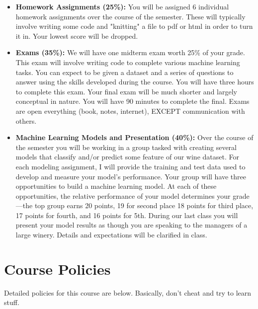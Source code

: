 \documentclass[11pt,]{article}
\begin{document}
\begin{itemize}

            
    \item \textbf{Homework Assignments (25\%):} You will be assigned 6 individual homework assignments over the course of the semester. These will typically involve writing some code and "knitting" a file to pdf or html in order to turn it in. Your lowest score will be dropped.
    
    \item \textbf{Exams (35\%):} We will have one midterm exam worth 25\% of your grade. This exam will involve writing code to complete various machine learning tasks. You can expect to be given a dataset and a series of questions to answer using the skills developed during the course. You will have three hours to complete this exam. Your final exam will be much shorter and largely conceptual in nature. You will have 90 minutes to complete the final. Exams are open everything (book, notes, internet), EXCEPT communication with others.

    \item \textbf{Machine Learning Models and Presentation (40\%):} Over the course of the semester you will be working in a group tasked with creating several models that classify and/or predict some feature of our wine dataset. For each modeling assignment, I will provide the training and test data used to develop and measure your model's performance. Your group will have three opportunities to build a machine learning model. At each of these opportunities, the relative performance of your model determines your grade---the top group earns 20 points, 19 for second place 18 points for third place, 17 points for fourth, and 16 points for 5th. During our last class you will present your model results as though you are speaking to the managers of a large winery. Details and expectations will be clarified in class.
\end{itemize}

\newpage

\hypertarget{course-policies}{%
\section{Course Policies}\label{course-policies}}

Detailed policies for this course are below. Basically, don't cheat and
try to learn stuff.
\end{document}
